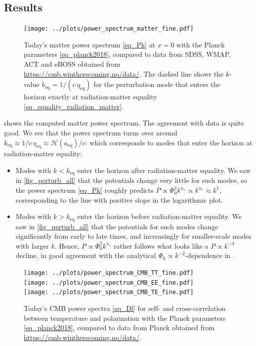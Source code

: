 \documentclass[10pt,a4paper]{article}
\begin{document}
\subsection{Results}

\begin{figure}
\centering
\texttt{[image: ../plots/power\_spectrum\_matter\_fine.pdf]}
\caption{
	Today's matter power spectrum \eqref{eq_Pk} at $x=0$ with the Planck parameters \eqref{eq_planck2018},
	compared to data from SDSS, WMAP, ACT and eBOSS obtained from \href{https://cmb.wintherscoming.no/data/}{https://cmb.wintherscoming.no/data/}.
	The dashed line shows the $k$-value $k_\text{eq} = 1/(c \, \eta_\text{eq})$ for the perturbation mode that enters the horizon exactly at radiation-matter equality \eqref{eq_equality_radiation_matter}.
}
\label{fig_power_spectrum_matter}
\end{figure}

 shows the computed matter power spectrum.
The agreement with data is quite good.
We see that the power spectrum turns over around
$k_\text{eq} \approx 1/c\,\eta_\text{eq} \approx \mathcal{H}(a_\text{eq})/c$:
which corresponds to modes that enter the horizon at radiation-matter equality:
\begin{itemize}
\item
Modes with $k<k_\text{eq}$ enter the horizon after radiation-matter equality.
We saw in \cref{fig_perturb_all} that the potentials change very little for such modes,
so the power spectrum \eqref{eq_Pk} roughly predicts $P \propto \Phi_0^2 k^{n_s} \propto k^{n_s} \approx k^1$,
corresponding to the line with positive slope in the logarithmic plot.

\item
Modes with $k>k_\text{eq}$ enter the horizon before radiation-matter equality.
We saw in \cref{fig_perturb_all} that the potentials for such modes change significantly from early to late times,
and increasingly for smaller-scale modes with larger $k$.
Hence, $P \propto \Phi_0^2 k^{n_s}$ rather follows what looks like a $P \propto k^{-3}$ decline,
in good agreement with the analytical $\Phi_0 \propto k^{-2}$-dependence in \cite[equation (8.71)]{dodelsonModernCosmology2021}.
\end{itemize}

\begin{figure}
\centering
\texttt{[image: ../plots/power\_spectrum\_CMB\_TT\_fine.pdf]} \\
\texttt{[image: ../plots/power\_spectrum\_CMB\_EE\_fine.pdf]} \\
\texttt{[image: ../plots/power\_spectrum\_CMB\_TE\_fine.pdf]}
\caption{
	Today's CMB power spectra \eqref{eq_Dl} for self- and cross-correlation between temperature and polarization with the Planck parameters \eqref{eq_planck2018},
	compared to data from Planck obtained from \href{https://cmb.wintherscoming.no/data/}{https://cmb.wintherscoming.no/data/}.
	\\ \ \\
}
\label{fig_power_spectrum_cmb}
\end{figure}
\end{document}
